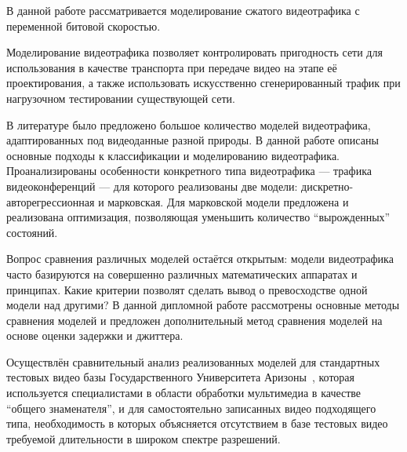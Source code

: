 В данной работе рассматривается моделирование
сжатого видеотрафика с переменной битовой скоростью.

Моделирование видеотрафика позволяет контролировать
пригодность сети для использования в качестве транспорта
при передаче видео на этапе её проектирования,
а также использовать искусственно сгенерированный трафик
при нагрузочном тестировании существующей сети.

В литературе было предложено большое количество моделей
видеотрафика, адаптированных под видеоданные разной природы.
В данной работе описаны основные подходы к классификации
и моделированию видеотрафика. Проанализированы особенности
конкретного типа видеотрафика --- трафика видеоконференций
--- для которого реализованы две модели:
дискретно-авторегрессионная и марковская. Для марковской
модели предложена и реализована оптимизация, позволяющая
уменьшить количество ``вырожденных'' состояний.

Вопрос сравнения различных моделей остаётся открытым:
модели видеотрафика часто базируются на совершенно
различных математических аппаратах и принципах.
Какие критерии позволят сделать вывод о превосходстве
одной модели над другими? В данной дипломной работе
рассмотрены основные методы сравнения моделей и
предложен дополнительный метод сравнения моделей
на основе оценки задержки и джиттера.

Осуществлён сравнительный анализ реализованных моделей
для стандартных тестовых видео базы Государственного
Университета Аризоны~\cite{traceas}, которая используется
специалистами в области обработки мультимедиа в качестве
``общего знаменателя'', и для самостоятельно записанных
видео подходящего типа, необходимость в которых объясняется
отсутствием в базе тестовых видео требуемой длительности
в широком спектре разрешений.
